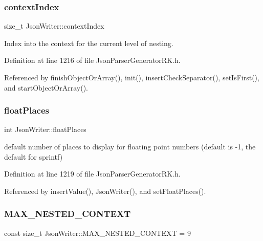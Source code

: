 \subsubsection{\texorpdfstring{context\+Index}{contextIndex}}
{\footnotesize\ttfamily size\+\_\+t Json\+Writer\+::context\+Index\hspace{0.3cm}{\ttfamily [protected]}}



Index into the context for the current level of nesting. 



Definition at line 1216 of file Json\+Parser\+Generator\+R\+K.\+h.



Referenced by finish\+Object\+Or\+Array(), init(), insert\+Check\+Separator(), set\+Is\+First(), and start\+Object\+Or\+Array().

\mbox{\label{class_json_writer_ab0c979f74ad01b6e9970ffed5b39cb29}} 
\subsubsection{\texorpdfstring{float\+Places}{floatPlaces}}
{\footnotesize\ttfamily int Json\+Writer\+::float\+Places\hspace{0.3cm}{\ttfamily [protected]}}



default number of places to display for floating point numbers (default is -\/1, the default for sprintf) 



Definition at line 1219 of file Json\+Parser\+Generator\+R\+K.\+h.



Referenced by insert\+Value(), Json\+Writer(), and set\+Float\+Places().

\mbox{\label{class_json_writer_a7d1daa126e962c611373f65d1e83e4ee}} 
\subsubsection{\texorpdfstring{M\+A\+X\+\_\+\+N\+E\+S\+T\+E\+D\+\_\+\+C\+O\+N\+T\+E\+XT}{MAX\_NESTED\_CONTEXT}}
{\footnotesize\ttfamily const size\+\_\+t Json\+Writer\+::\+M\+A\+X\+\_\+\+N\+E\+S\+T\+E\+D\+\_\+\+C\+O\+N\+T\+E\+XT = 9\hspace{0.3cm}{\ttfamily [static]}}

